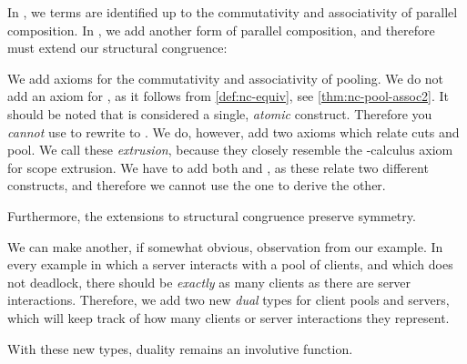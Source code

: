 In \rcp, we terms are identified up to the commutativity and associativity of
parallel composition. In \nodcap, we add another form of parallel composition,
and therefore must extend our structural congruence:

We add axioms for the commutativity and associativity of pooling.
We do not add an axiom for , as it follows from
\cref{def:nc-equiv}, see \cref{thm:nc-pool-assoc2}.
It should be noted that  is considered a single,
\emph{atomic} construct.
Therefore you \emph{cannot} use  to rewrite
 to .
We do, however, add two axioms which relate cuts and pool.
We call these \emph{extrusion}, because they closely resemble the
\textpi-calculus axiom for scope extrusion.
We have to add both  and , as these relate two
different constructs, and therefore we cannot use the one to derive the other.

Furthermore, the extensions to structural congruence preserve symmetry.

We can make another, if somewhat obvious, observation from our example.
In every example in which a server interacts with a pool of clients, and which
does not deadlock, there should be \emph{exactly} as many clients as there are
server interactions.
Therefore, we add two new \emph{dual} types for client pools and servers, which
will keep track of how many clients or server interactions they represent.


With these new types, duality remains an involutive function.


